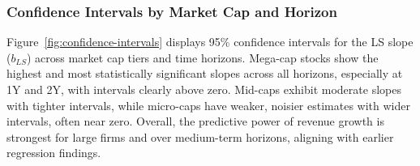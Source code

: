 \documentclass[11pt]{article}
\begin{document}
\FloatBarrier

\subsubsection{Confidence Intervals by Market Cap and Horizon}

Figure~\ref{fig:confidence-intervals} displays 95\% confidence intervals for the LS slope ($b_{LS}$) across market cap tiers and time horizons. Mega-cap stocks show the highest and most statistically significant slopes across all horizons, especially at 1Y and 2Y, with intervals clearly above zero. Mid-caps exhibit moderate slopes with tighter intervals, while micro-caps have weaker, noisier estimates with wider intervals, often near zero. Overall, the predictive power of revenue growth is strongest for large firms and over medium-term horizons, aligning with earlier regression findings.

\FloatBarrier
\end{document}
